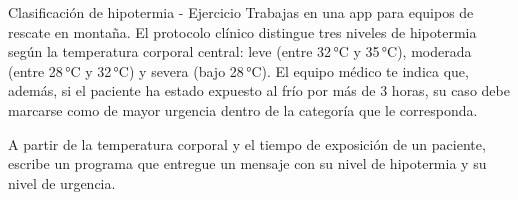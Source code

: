 \documentclass{beamer}
\begin{document}
    \begin{frame}{Clasificación de hipotermia - Ejercicio}
        Trabajas en una app para equipos de rescate en montaña. El protocolo clínico distingue tres 
        niveles de hipotermia según la temperatura corporal central: leve (entre 32\,°C y 35\,°C), 
        moderada (entre 28\,°C y 32\,°C) y severa (bajo 28\,°C). El equipo médico te indica que, además, 
        si el paciente ha estado expuesto al frío por más de 3 horas, su caso debe marcarse como de 
        mayor urgencia dentro de la categoría que le corresponda.

        A partir de la temperatura corporal y el tiempo de exposición de un paciente, escribe un 
        programa que entregue un mensaje con su nivel de hipotermia y su nivel de urgencia.
    \end{frame}

    

\end{document}
